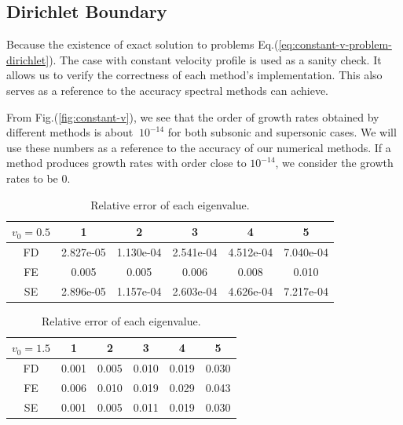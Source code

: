 \subsection{Dirichlet Boundary}
Because the existence of exact solution to problems Eq.(\ref{eq:constant-v-problem-dirichlet}). The case with constant velocity profile is used as a sanity check. It allows us to verify the correctness of each method's implementation. This also serves as a reference to the accuracy spectral methods can achieve.

From Fig.(\ref{fig:constant-v}), we see that the order of growth rates obtained by different methods is about $~10^{-14}$ for both subsonic and supersonic cases. We will use these numbers as a reference to the accuracy of our numerical methods. If a method produces growth rates with order close to $10^{-14}$, we consider the growth rates to be 0.

\begin{table} [H]
	\centering
	\caption{Relative error of each eigenvalue.}
	\begin{tabular}{|c|c|c|c|c|c|}
		\hline
		$v_0=0.5$   & 1 & 2 & 3 & 4 & 5 \\
		\hline
		FD & 2.827e-05 & 1.130e-04 & 2.541e-04 & 4.512e-04 & 7.040e-04 \\
		\hline
		FE & 0.005 & 0.005 & 0.006 & 0.008 & 0.010  \\
		\hline
		SE & 2.896e-05 & 1.157e-04 & 2.603e-04 & 4.626e-04 & 7.217e-04 \\
		\hline
	\end{tabular}
	\begin{tabular}{|c|c|c|c|c|c|}
		\hline
		$v_0=1.5$   & 1 & 2 & 3 & 4 & 5 \\
		\hline
		FD & 0.001 & 0.005 & 0.010 & 0.019 & 0.030 \\
		\hline
		FE & 0.006 & 0.010 & 0.019 & 0.029 & 0.043  \\
		\hline
		SE & 0.001 & 0.005 & 0.011 & 0.019 & 0.030 \\
		\hline
	\end{tabular}
	\label{table:eigenvalue-error-dirichlet}
\end{table}

